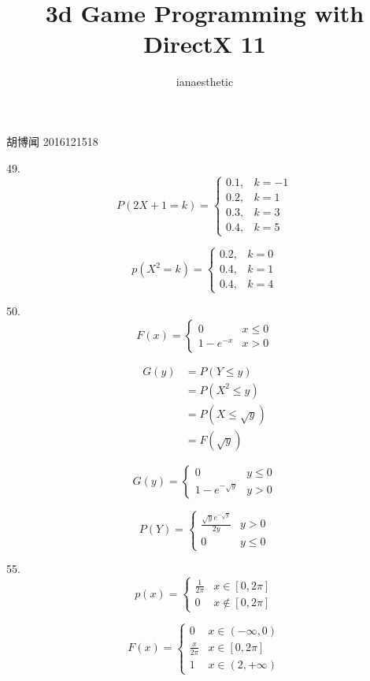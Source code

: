 \documentclass[10pt, a4paper,twocolumn]{article}
\author{ianaesthetic}
\title{3d Game Programming with DirectX 11}
\begin{document}
    胡博闻 2016121518 
    \medskip 

    49. 
    $$
        P(2X + 1 = k) = 
        \begin{cases}
            0.1, & k = -1 \\
            0.2, & k = 1 \\
            0.3, & k = 3 \\
            0.4, & k = 5
        \end{cases}
    $$

    $$
        p(X^2 = k) = 
        \begin{cases}
            0.2, & k = 0 \\ 
            0.4, & k = 1 \\
            0.4, & k = 4 
        \end{cases}
    $$

    50.
    $$F(x) = 
        \begin{cases}
            0 & x \leqslant 0 \\
        1 - e^{-x}  & x > 0
        \end{cases}
    $$

    $$
        \begin{aligned}
            G(y)
            &= P(Y \leqslant y) \\
            &= P(X^2 \leqslant y) \\
            &= P(X \leqslant \sqrt{y}) \\
            &= F(\sqrt{y})  
        \end{aligned}
    $$

    $$
        G(y) = 
        \begin{cases}
            0 & y \leqslant 0 \\ 
            1 - e^{-\sqrt{y}} & y > 0 
        \end{cases}
    $$

    $$
        P(Y) = 
        \begin{cases}
            \frac{\sqrt{y}e^{-\sqrt{y}}}{2y} & y >  0 \\
            0 & y \leqslant 0 
        \end{cases}
    $$

    55. 
    $$
        p(x) = 
        \begin{cases}
            \frac{1}{2\pi} & x \in [0, 2\pi] \\
            0 & x \notin  [0, 2\pi]
        \end{cases}
    $$

    $$
        F(x) = 
        \begin{cases}
            0 & x \in (-\infty, 0) \\
            \frac{x}{2\pi} & x \in [0, 2\pi] \\
            1 & x \in (2, +\infty)
        \end{cases}
    $$
\end{document}

